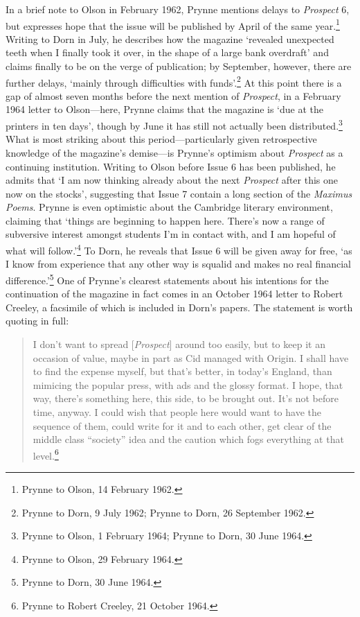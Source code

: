 \documentclass[]{article}
\begin{document}
In a brief note to Olson in February 1962, Prynne mentions delays to
\emph{Prospect} 6, but expresses hope that the issue will be published
by April of the same year.\footnote{Prynne to Olson, 14 February 1962.}
Writing to Dorn in July, he describes how the magazine `revealed
unexpected teeth when I finally took it over, in the shape of a large
bank overdraft' and claims finally to be on the verge of publication; by
September, however, there are further delays, `mainly through
difficulties with funds'.\footnote{Prynne to Dorn, 9 July 1962; Prynne
  to Dorn, 26 September 1962.} At this point there is a gap of almost
seven months before the next mention of \emph{Prospect}, in a February
1964 letter to Olson---here, Prynne claims that the magazine is `due at
the printers in ten days', though by June it has still not actually been
distributed.\footnote{Prynne to Olson, 1 February 1964; Prynne to Dorn,
  30 June 1964.} What is most striking about this period---particularly
given retrospective knowledge of the magazine's demise---is Prynne's
optimism about \emph{Prospect} as a continuing institution. Writing to
Olson before Issue 6 has been published, he admits that `I am now
thinking already about the next \emph{Prospect} after this one now on
the stocks', suggesting that Issue 7 contain a long section of the
\emph{Maximus Poems}. Prynne is even optimistic about the Cambridge
literary environment, claiming that `things are beginning to happen
here. There's now a range of subversive interest amongst students I'm in
contact with, and I am hopeful of what will follow.'\footnote{Prynne to
  Olson, 29 February 1964.} To Dorn, he reveals that Issue 6 will be
given away for free, `as I know from experience that any other way is
squalid and makes no real financial difference.'\footnote{Prynne to
  Dorn, 30 June 1964.} One of Prynne's clearest statements about his
intentions for the continuation of the magazine in fact comes in an
October 1964 letter to Robert Creeley, a facsimile of which is included
in Dorn's papers. The statement is worth quoting in full:

\begin{quote}
I don't want to spread {[}\emph{Prospect}{]} around too easily, but to
keep it an occasion of value, maybe in part as Cid managed with Origin.
I shall have to find the expense myself, but that's better, in today's
England, than mimicing the popular press, with ads and the glossy
format. I hope, that way, there's something here, this side, to be
brought out. It's not before time, anyway. I could wish that people here
would want to have the sequence of them, could write for it and to each
other, get clear of the middle class ``society'' idea and the caution
which fogs everything at that level.\footnote{Prynne to Robert Creeley,
  21 October 1964.}
\end{quote}
\end{document}
